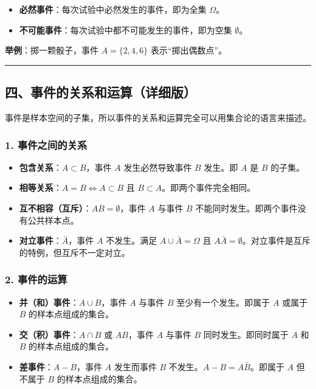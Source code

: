 \documentclass[12pt,a4paper]{ctexart}
\begin{document}
\begin{itemize}[noitemsep]
    \item \textbf{必然事件}：每次试验中必然发生的事件，即为全集 $\Omega$。
    \item \textbf{不可能事件}：每次试验中都不可能发生的事件，即为空集 $\emptyset$。
\end{itemize}

\textbf{举例}：掷一颗骰子，事件 $A = \{2,4,6\}$ 表示“掷出偶数点”。

\vspace{1em}\hrule\vspace{1em}

\subsection{四、事件的关系和运算（详细版）}

事件是样本空间的子集，所以事件的关系和运算完全可以用集合论的语言来描述。

\subsubsection{1. 事件之间的关系}
\begin{itemize}[noitemsep]
    \item \textbf{包含关系}：$A \subset B$，事件 $A$ 发生必然导致事件 $B$ 发生。即 $A$ 是 $B$ 的子集。
    \item \textbf{相等关系}：$A = B \iff A \subset B$ 且 $B \subset A$。即两个事件完全相同。
    \item \textbf{互不相容（互斥）}：$AB = \emptyset$，事件 $A$ 与事件 $B$ 不能同时发生。即两个事件没有公共样本点。
    \item \textbf{对立事件}：$\bar{A}$，事件 $A$ 不发生。满足 $A \cup \bar{A} = \Omega$ 且 $A\bar{A} = \emptyset$。对立事件是互斥的特例，但互斥不一定对立。
\end{itemize}

\subsubsection{2. 事件的运算}
\begin{itemize}[noitemsep]
    \item \textbf{并（和）事件}：$A \cup B$，事件 $A$ 与事件 $B$ 至少有一个发生。即属于 $A$ 或属于 $B$ 的样本点组成的集合。
    \item \textbf{交（积）事件}：$A \cap B$ 或 $AB$，事件 $A$ 与事件 $B$ 同时发生。即同时属于 $A$ 和 $B$ 的样本点组成的集合。
    \item \textbf{差事件}：$A - B$，事件 $A$ 发生而事件 $B$ 不发生。$A - B = A\bar{B}$。即属于 $A$ 但不属于 $B$ 的样本点组成的集合。
\end{itemize}
\end{document}
